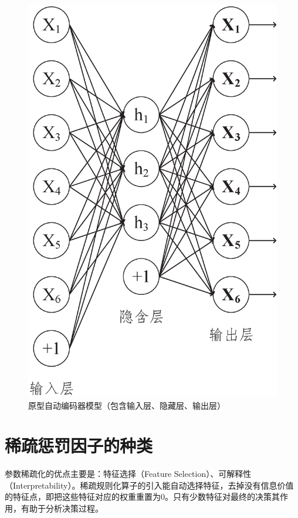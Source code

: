 \documentclass[oneside]{ZJUthesis}
\begin{document}
\begin{figure}[h]
\centering
\includegraphics[scale=0.4]{./Pictures/origAE.eps}
\caption{原型自动编码器模型（包含输入层、隐藏层、输出层）}
\label{fig:origAE}
\end{figure}


\section{稀疏惩罚因子的种类}
参数稀疏化的优点主要是：特征选择（Feature Selection）、可解释性（Interpretability）\cite{DBLP:journals/jmlr/Hoyer04}。稀疏规则化算子的引入能自动选择特征，去掉没有信息价值的特征点，即把这些特征对应的权重重置为0。只有少数特征对最终的决策其作用，有助于分析决策过程。
\end{document}
